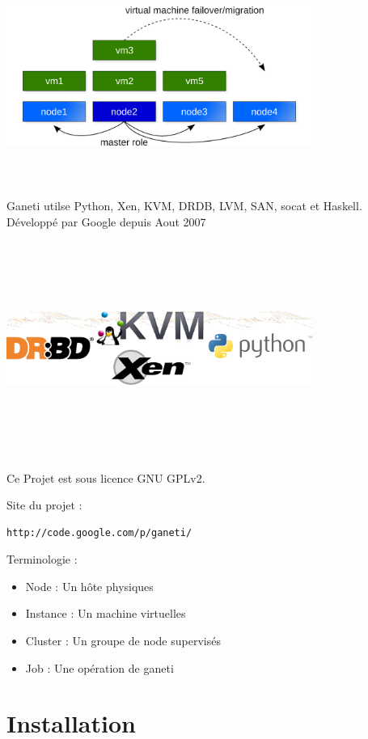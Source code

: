 \includegraphics[width=10cm,height=7cm]{images/principe_ganeti.png}


Ganeti utilse Python, Xen, KVM, DRDB, LVM, SAN, socat et Haskell.
Développé par Google depuis Aout 2007

\includegraphics[width=10cm,height=7cm]{images/image1.png}

Ce Projet est sous licence GNU GPLv2.

Site du projet :
\begin{lstlisting}
http://code.google.com/p/ganeti/
\end{lstlisting}

Terminologie :
\begin{itemize}
\item Node : Un hôte physiques
\item Instance : Un machine virtuelles
\item Cluster : Un groupe de node supervisés
\item Job : Une opération de ganeti
\end{itemize}

\section {Installation}
